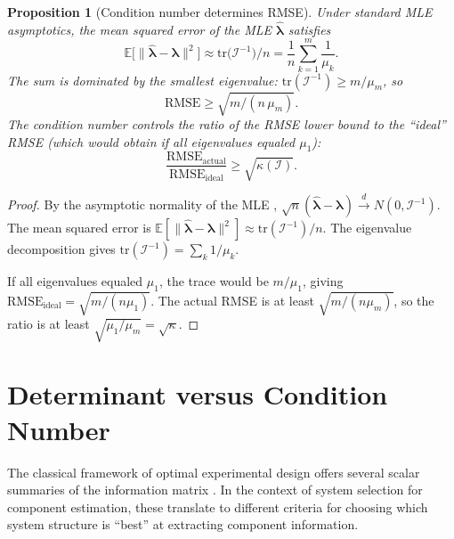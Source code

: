 \documentclass[12pt]{article}
\newtheorem{proposition}[theorem]{Proposition}
\theoremstyle{definition}
\theoremstyle{remark}
\newcommand{\E}{\mathbb{E}}
\newcommand{\tr}{\mathrm{tr}}
\newcommand{\blam}{\boldsymbol{\lambda}}
\begin{document}
\begin{proposition}[Condition number determines RMSE]
\label{prop:kappa-rmse}
Under standard MLE asymptotics, the mean squared error of the MLE
$\hat{\blam}$ satisfies
\begin{equation}\label{eq:mse-trace}
  \E\bigl[\|\hat{\blam} - \blam\|^2\bigr]
  \approx \tr\bigl(\mathcal{I}^{-1}\bigr) / n
  = \frac{1}{n}\sum_{k=1}^m \frac{1}{\mu_k}.
\end{equation}
The sum is dominated by the smallest eigenvalue:
$\tr(\mathcal{I}^{-1}) \geq m / \mu_m$, so
\begin{equation}\label{eq:rmse-bound}
  \mathrm{RMSE} \geq \sqrt{m / (n\,\mu_m)}.
\end{equation}
The condition number controls the ratio of the RMSE lower bound to
the ``ideal'' RMSE (which would obtain if all eigenvalues equaled
$\mu_1$):
\begin{equation}\label{eq:rmse-ratio}
  \frac{\mathrm{RMSE}_{\text{actual}}}{\mathrm{RMSE}_{\text{ideal}}}
  \geq \sqrt{\kappa(\mathcal{I})}.
\end{equation}
\end{proposition}

\begin{proof}
By the asymptotic normality of the MLE
\citep{VanDerVaart1998, LehmannCasella1998},
$\sqrt{n}(\hat{\blam} - \blam) \xrightarrow{d} N(0, \mathcal{I}^{-1})$.
The mean squared error is
$\E[\|\hat{\blam} - \blam\|^2] \approx \tr(\mathcal{I}^{-1}) / n$.
The eigenvalue decomposition gives
$\tr(\mathcal{I}^{-1}) = \sum_k 1/\mu_k$.

If all eigenvalues equaled $\mu_1$, the trace would be $m/\mu_1$,
giving $\mathrm{RMSE}_{\text{ideal}} = \sqrt{m/(n\mu_1)}$.
The actual RMSE is at least $\sqrt{m/(n\mu_m)}$, so the ratio is
at least $\sqrt{\mu_1/\mu_m} = \sqrt{\kappa}$.
\end{proof}


\section{Determinant versus Condition Number}
\label{sec:det-vs-kappa}

The classical framework of optimal experimental design offers several
scalar summaries of the information matrix
\citep{Kiefer1974, Pukelsheim2006}.  In the context of system selection
for component estimation, these translate to different criteria for
choosing which system structure is ``best'' at extracting component
information.
\end{document}
